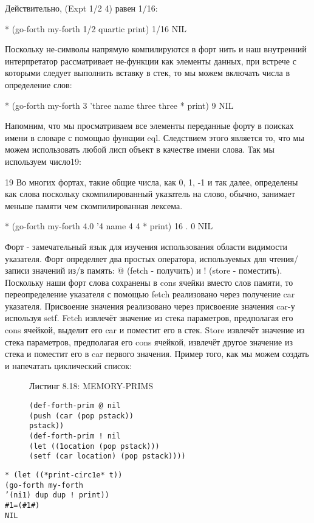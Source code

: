 {{{Действительно, (Expt 1/2 4) равен 1/16:

* (go-forth my-forth
1/2 quartic print)
1/16
NIL

Поскольку не-символы напрямую компилируются в форт нить и наш внутренний интерпретатор рассматривает  не-функции как элементы данных, при встрече с которыми следует выполнить вставку в стек, то мы можем включать числа в определение слов:

* (go-forth my-forth
{ 3 } ’three name
three three * print)
9
NIL

Напомним, что мы просматриваем все элементы переданные форту в поисках имени в словаре с помощью функции eql. Следствием этого является то, что мы можем использовать любой лисп объект в качестве имени слова. Так мы используем число19:

19 Во многих фортах, такие общие числа, как 0, 1, -1 и так далее, определены как слова поскольку скомпилированный указатель на слово, обычно, занимает меньше памяти чем скомпилированная лексема.

* (go-forth my-forth
{ 4.0 } ’4 name
4 4 * print)
16 . 0
NIL

Форт - замечательный язык для изучения использования области видимости указателя. Форт определяет два простых оператора, используемых для чтения/записи значений из/в память: @ (fetch - получить) и ! (store - поместить). Поскольку наши форт слова сохранены в cons ячейки вместо слов памяти, то переопределение указателя с помощью fetch реализовано через получение car указателя. Присвоение значения реализовано через присвоение значения car-у используя setf. Fetch извлечёт значение из стека параметров, предполагая его cons ячейкой, выделит его car и поместит его в стек. Store извлечёт значение из стека параметров, предполагая его cons ячейкой, извлечёт другое значение из стека и поместит его в car первого значения. Пример того, как мы можем создать и напечатать циклический список:

\begin{figure}Листинг 8.18: MEMORY-PRIMS\label{listing_8.18}
\listbegin
\begin{verbatim}
(def-forth-prim @ nil
(push (car (pop pstack))
pstack))
(def-forth-prim ! nil
(let ((1ocation (pop pstack)))
(setf (car location) (pop pstack))))
\end{verbatim}
\listend
\end{figure}

\begin{verbatim}
* (let ((*print-circ1e* t))
(go-forth my-forth
’(ni1) dup dup ! print))
#1=(#1#)
NIL
\end{verbatim}

}}}
